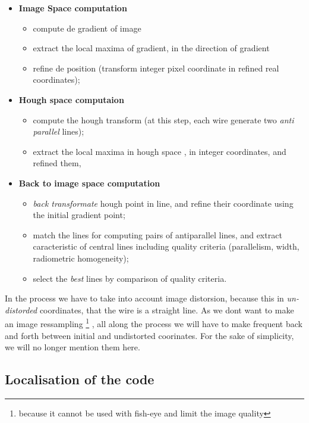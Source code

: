 \begin{itemize}
    \item {\bf Image Space computation}
         \begin{itemize}
              \item compute de gradient of image 
              \item extract the local maxima of gradient, in the direction of gradient
              \item refine de position  (transform integer pixel coordinate in refined real coordinates);
         \end{itemize}
    \item {\bf Hough space computaion}
         \begin{itemize}
             \item compute the hough transform  (at this step, each wire generate two \emph{anti parallel} lines);
             \item extract the local maxima in hough space , in integer coordinates, and refined them, 
         \end{itemize}

    \item {\bf Back to image space computation}
         \begin{itemize}
             \item \emph{back transformate} hough point in line, and refine their coordinate using the initial gradient point;
             \item match the lines for computing pairs of antiparallel lines, and extract caracteristic of central lines
                   including quality criteria (parallelism, width, radiometric homogeneity);
             \item select the \emph{best} lines by comparison of quality criteria.
         \end{itemize}
\end{itemize}

In the process we have to take into account image distorsion, because this in \emph{un-distorded} coordinates,
that the wire is a straight line. As we dont want to make an image ressampling
\footnote{because it cannot be used with fish-eye and limit the image quality} , all along the process we
will have to make frequent back and forth between initial and undistorted coorinates.  For the sake
of simplicity, we will no longer mention them here.

\subsection{Localisation of the code}

